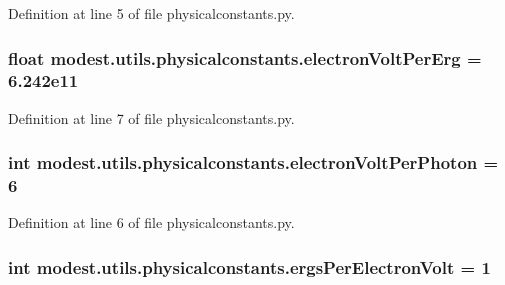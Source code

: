 Definition at line 5 of file physicalconstants.\+py.

\subsubsection[{\texorpdfstring{electron\+Volt\+Per\+Erg}{electronVoltPerErg}}]{\setlength{\rightskip}{0pt plus 5cm}float modest.\+utils.\+physicalconstants.\+electron\+Volt\+Per\+Erg = 6.\+242e11}\hypertarget{namespacemodest_1_1utils_1_1physicalconstants_ae4bd0051685a48d01b60178bf81e217a}{}\label{namespacemodest_1_1utils_1_1physicalconstants_ae4bd0051685a48d01b60178bf81e217a}


Definition at line 7 of file physicalconstants.\+py.

\subsubsection[{\texorpdfstring{electron\+Volt\+Per\+Photon}{electronVoltPerPhoton}}]{\setlength{\rightskip}{0pt plus 5cm}int modest.\+utils.\+physicalconstants.\+electron\+Volt\+Per\+Photon = 6}\hypertarget{namespacemodest_1_1utils_1_1physicalconstants_a5de6a1f36432c45571ffb47ac2f9363a}{}\label{namespacemodest_1_1utils_1_1physicalconstants_a5de6a1f36432c45571ffb47ac2f9363a}


Definition at line 6 of file physicalconstants.\+py.

\subsubsection[{\texorpdfstring{ergs\+Per\+Electron\+Volt}{ergsPerElectronVolt}}]{\setlength{\rightskip}{0pt plus 5cm}int modest.\+utils.\+physicalconstants.\+ergs\+Per\+Electron\+Volt = 1}\hypertarget{namespacemodest_1_1utils_1_1physicalconstants_ad65e050e106abd959ed2133d5d10480f}{}\label{namespacemodest_1_1utils_1_1physicalconstants_ad65e050e106abd959ed2133d5d10480f}


